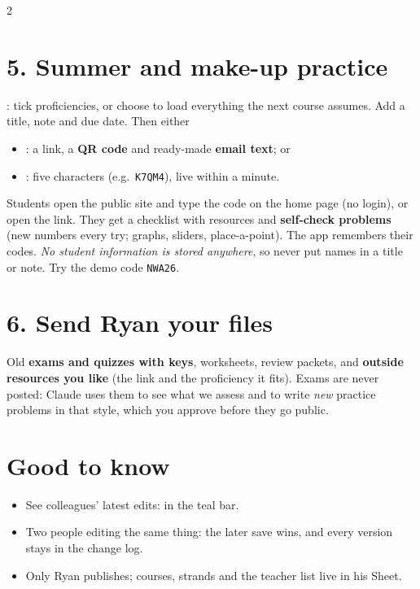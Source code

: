 \documentclass[10pt]{article}
\begin{document}
\begin{multicols}{2}
\section*{5. Summer and make-up practice}
: tick proficiencies, or choose  to load
everything the next course assumes. Add a title, note and due date. Then either
\begin{itemize}
\item {}: a link, a \textbf{QR code} and ready-made \textbf{email text}; or
\item {}: five characters (e.g.\ \texttt{K7QM4}), live within a minute.
\end{itemize}
Students open the public site and type the code on the home page (no login), or open the link. They
get a checklist with resources and \textbf{self-check problems} (new numbers every try; graphs, sliders,
place-a-point). The app remembers their codes. \emph{No student information is stored anywhere}, so
never put names in a title or note. Try the demo code \texttt{NWA26}.

\section*{6. Send Ryan your files}
Old \textbf{exams and quizzes with keys}, worksheets, review packets, and \textbf{outside resources you
like} (the link and the proficiency it fits). Exams are never posted: Claude uses them to see what we
assess and to write \emph{new} practice problems in that style, which you approve before they go public.

\section*{Good to know}
\begin{itemize}
\item See colleagues' latest edits:  in the teal bar.
\item Two people editing the same thing: the later save wins, and every version stays in the change log.
\item Only Ryan publishes; courses, strands and the teacher list live in his Sheet.
\end{itemize}
\end{multicols}
\end{document}
